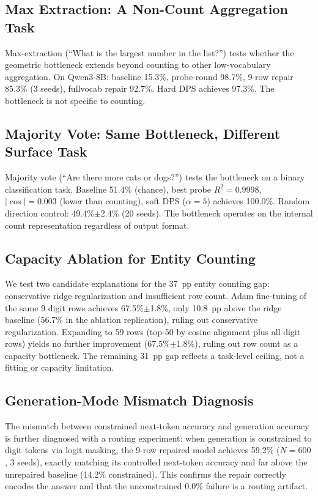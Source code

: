 \documentclass{article}
\begin{document}
\subsection{Max Extraction: A Non-Count Aggregation Task}
\label{sec:max_extraction}

Max-extraction (``What is the largest number in the list?'') tests whether the
geometric bottleneck extends beyond counting to other low-vocabulary
aggregation. On Qwen3-8B: baseline 15.3\%, probe-round 98.7\%, 9-row repair
85.3\% (3 seeds), fullvocab repair 92.7\%. Hard DPS achieves 97.3\%. The
bottleneck is not specific to counting.

\subsection{Majority Vote: Same Bottleneck, Different Surface Task}
\label{sec:majority_vote}

Majority vote (``Are there more cats or dogs?'') tests the bottleneck on a
binary classification task. Baseline 51.4\% (chance), best probe $R^2 =
0.9998$, $|\cos| = 0.003$ (lower than counting), soft DPS ($\alpha{=}5$)
achieves 100.0\%. Random direction control: 49.4\%$\pm$2.4\% (20 seeds). The
bottleneck operates on the internal count representation regardless of output
format.

\subsection{Capacity Ablation for Entity Counting}
\label{sec:capacity_ablation}

We test two candidate explanations for the 37~pp entity counting gap:
conservative ridge regularization and insufficient row count. Adam fine-tuning
of the same 9 digit rows achieves 67.5\%$\pm$1.8\%, only 10.8~pp above the
ridge baseline (56.7\% in the ablation replication), ruling out conservative
regularization. Expanding to 59 rows (top-50 by cosine alignment plus all digit
rows) yields no further improvement (67.5\%$\pm$1.8\%), ruling out row count
as a capacity bottleneck. The remaining 31~pp gap reflects a task-level ceiling,
not a fitting or capacity limitation.

\subsection{Generation-Mode Mismatch Diagnosis}
\label{sec:genmode_mismatch}

The mismatch between constrained next-token accuracy and generation accuracy is
further diagnosed with a routing experiment: when generation is constrained to
digit tokens via logit masking, the 9-row repaired model achieves 59.2\%
($N{=}600$, 3 seeds), exactly matching its controlled next-token accuracy and
far above the unrepaired baseline (14.2\% constrained). This confirms the
repair correctly encodes the answer and that the unconstrained 0.0\% failure is
a routing artifact.

\newpage

\end{document}
